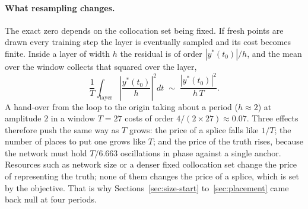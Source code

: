 \documentclass[11pt,a4paper]{article}
\begin{document}
\paragraph{What resampling changes.}
The exact zero depends on the collocation set being fixed. If fresh
points are drawn every training step the layer is eventually sampled
and its cost becomes finite. Inside a layer of width $h$ the residual is
of order $|y^{\ast}(t_0)|/h$, and the mean over the window collects that
squared over the layer,
\begin{equation}
  \frac{1}{T} \int_{\mathrm{layer}} \left| \frac{y^{\ast}(t_0)}{h} \right|^2 dt
  \;\sim\; \frac{|y^{\ast}(t_0)|^2}{h\, T}.
  \label{eq:layerprice}
\end{equation}
A hand-over from the loop to the origin taking about a period
($h \approx 2$) at amplitude $2$ in a window $T = 27$ costs of order
$4/(2 \times 27) \approx 0.07$. Three effects therefore push the same
way as $T$ grows: the price of a splice falls like $1/T$; the number of
places to put one grows like $T$; and the price of the truth rises,
because the network must hold $T/6.663$ oscillations in phase against a
single anchor. Resources such as network size or a denser fixed
collocation set change the price of representing the truth; none of
them changes the price of a splice, which is set by the objective. That
is why Sections~\ref{sec:size-start} to~\ref{sec:placement} came back
null at four periods.
\end{document}
